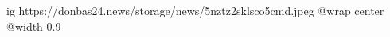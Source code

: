  
 
 
 
 

\ifcmt
  ig https://donbas24.news/storage/news/5nztz2sklsco5cmd.jpeg
  @wrap center
  @width 0.9
\fi
